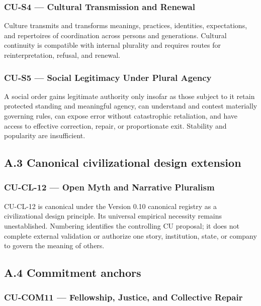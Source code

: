 \documentclass[
  11pt,
]{article}
\begin{document}
\subsubsection{CU-S4 --- Cultural Transmission and
Renewal}\label{cu-s4-cultural-transmission-and-renewal-1}

Culture transmits and transforms meanings, practices, identities,
expectations, and repertoires of coordination across persons and
generations. Cultural continuity is compatible with internal plurality
and requires routes for reinterpretation, refusal, and renewal.

\subsubsection{CU-S5 --- Social Legitimacy Under Plural
Agency}\label{cu-s5-social-legitimacy-under-plural-agency-1}

A social order gains legitimate authority only insofar as those subject
to it retain protected standing and meaningful agency, can understand
and contest materially governing rules, can expose error without
catastrophic retaliation, and have access to effective correction,
repair, or proportionate exit. Stability and popularity are
insufficient.

\subsection{A.3 Canonical civilizational design
extension}\label{a.3-canonical-civilizational-design-extension}

\subsubsection{CU-CL-12 --- Open Myth and Narrative
Pluralism}\label{cu-cl-12-open-myth-and-narrative-pluralism-2}

CU-CL-12 is canonical under the Version 0.10 canonical registry as a
civilizational design principle. Its universal empirical necessity
remains unestablished. Numbering identifies the controlling CU proposal;
it does not complete external validation or authorize one story,
institution, state, or company to govern the meaning of others.

\subsection{A.4 Commitment anchors}\label{a.4-commitment-anchors}

\subsubsection{CU-COM11 --- Fellowship, Justice, and Collective
Repair}\label{cu-com11-fellowship-justice-and-collective-repair-1}
\end{document}
